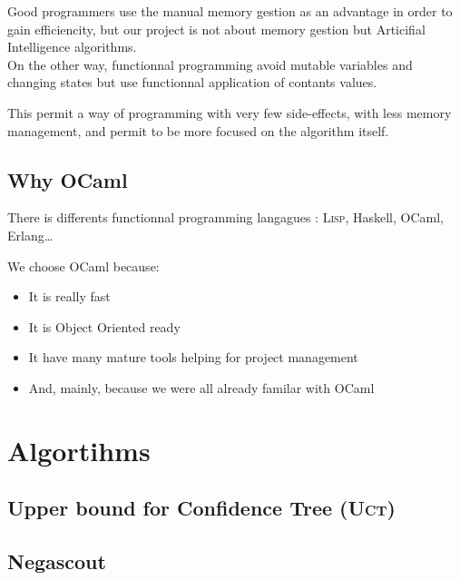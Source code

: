 Good programmers use the manual memory gestion as an advantage in order to gain efficiencity, but our project is not about memory gestion but Articifial Intelligence algorithms.\\

On the other way, functionnal programming avoid mutable variables and changing states but use functionnal application of contants values.

This permit a way of programming with very few side-effects, with less memory management, and permit to be more focused on the algorithm itself.

\subsection{Why OCaml}

There is differents functionnal programming langagues : \textsc{Lisp}, Haskell, OCaml, Erlang\ldots

We choose OCaml because:
\begin{itemize}
\item It is really fast
\item It is Object Oriented ready
\item It have many mature tools helping for project management
\item And, mainly, because we were all already familar with OCaml
\end{itemize}


\section{Algortihms}

\subsection{Upper bound for Confidence Tree (\textsc{Uct})}

\subsection{Negascout}



